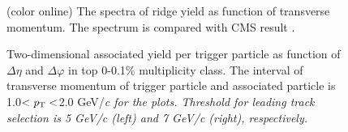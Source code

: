 \begin{figure}
	\centering
	\caption{(color online) The spectra of ridge yield as function of transverse momentum. The spectrum is compared with CMS result \cite{ridge_pp_1}.}
\end{figure}


\begin{figure}
	\centering
	\caption{ Two-dimensional associated yield per trigger particle as function of $\Delta\eta$ and $\Delta\varphi$ in top 0-0.1\% multiplicity class. The interval of transverse momentum of trigger particle and associated particle is 1.0$<\it{p}_{\rm{T}}<$2.0 GeV/\it{c}\rm{} for the plots. Threshold for leading track selection is 5 GeV/\it{c}\rm{} (left) and 7 GeV/\it{c}\rm{} (right), respectively. }
\end{figure}

